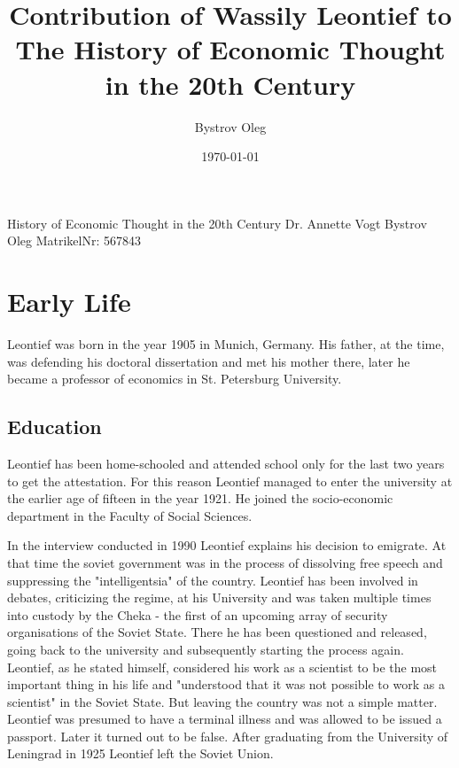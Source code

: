 \documentclass[12pt,a4paper]{scrartcl}
\title{Contribution of Wassily Leontief to The History of Economic Thought in the 20th Century}
\author{Bystrov Oleg}
\date{\today}
\begin{document}
	\maketitle
	

History of Economic Thought in the 20th Century \newline
Dr. Annette Vogt \newline
\newline
Bystrov Oleg \newline
MatrikelNr: 567843


	
	\clearpage

	
%	
	
	
	
	\section{Early Life}
	
	Leontief was born in the year 1905 in Munich, Germany. His father, at the time, was defending his doctoral dissertation and met his mother there, later he became a professor of economics in St. Petersburg University. \cite[pp.347-355]{Kaliadina2006} \cite[]{wassily.leontief.server}
	
	\subsection{Education}
	
	Leontief has been home-schooled and attended school only for the last two years to get the attestation. For this reason Leontief managed to enter the university at the earlier age of fifteen in the year 1921. He joined the socio-economic department in the Faculty of Social Sciences. 
	
	In the interview conducted in 1990 \cite[]{Kaliadina2006} Leontief explains his decision to emigrate. At that time the soviet government was in the process of dissolving free speech and suppressing the "intelligentsia" of the country. Leontief has been involved in debates, criticizing the regime, at his University and was taken multiple times into custody by the Cheka - the first of an upcoming array of security organisations of the Soviet State. There he has been questioned and released, going back to the university and subsequently starting the process again. Leontief, as he stated himself, considered his work as a scientist to be the most important thing in his life and "understood that it was not possible to work as a scientist" \cite[p.351]{Kaliadina2006} in the Soviet State. But leaving the country was not a simple matter. Leontief was presumed to have a terminal illness and was allowed to be issued a passport. Later it turned out to be false. After graduating from the University of Leningrad in 1925 Leontief left the Soviet Union.
	
\end{document}
